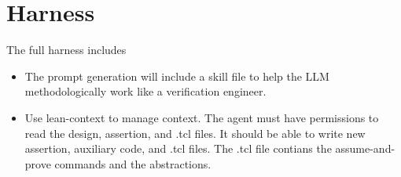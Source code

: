 \section{Harness}
\label{sec:harness}

The full harness includes

\begin{itemize}
    \item The prompt generation will include a skill file to help the LLM methodologically work like a verification engineer.
    \item Use lean-context to manage context. The agent must have permissions to read the design, assertion, and .tcl files. It should be able to write new assertion, auxiliary code, and .tcl files. The .tcl file contians the assume-and-prove commands and the abstractions.
\end{itemize}
